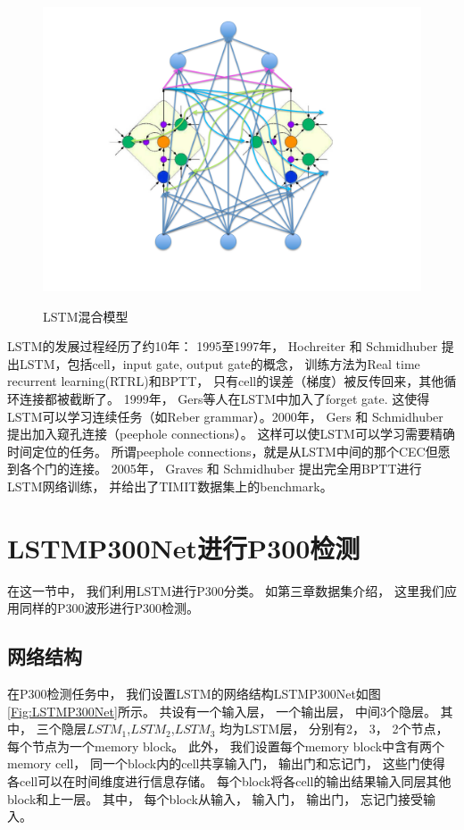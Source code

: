 \begin{figure}[htb]
  \centering
  \includegraphics[scale = 0.5]{Pictures/LSTM/lstm_mixture_model.pdf}\\
  \caption{LSTM混合模型}\label{Fig:lstm_mixture}
\end{figure}

LSTM的发展过程经历了约10年： 1995至1997年，  Hochreiter 和 Schmidhuber 提出LSTM，包括cell，input gate, output gate的概念， 训练方法为Real time recurrent learning(RTRL)和BPTT， 只有cell的误差（梯度）被反传回来，其他循环连接都被截断了。 1999年，  Gers等人在LSTM中加入了forget gate. 这使得LSTM可以学习连续任务（如Reber grammar）。2000年， Gers 和 Schmidhuber 提出加入窥孔连接（peephole connections）。 这样可以使LSTM可以学习需要精确时间定位的任务。 所谓peephole connections，就是从LSTM中间的那个CEC但愿到各个门的连接。 2005年， Graves 和 Schmidhuber 提出完全用BPTT进行LSTM网络训练， 并给出了TIMIT数据集上的benchmark。





\section{LSTMP300Net进行P300检测}

在这一节中， 我们利用LSTM进行P300分类。 如第三章数据集介绍， 这里我们应用同样的P300波形进行P300检测。 

\subsection{网络结构}
在P300检测任务中， 我们设置LSTM的网络结构LSTMP300Net如图\ref{Fig:LSTMP300Net}所示。 共设有一个输入层， 一个输出层， 中间3个隐层。 其中， 三个隐层$LSTM_1$,$LSTM_2$,$LSTM_3$ 均为LSTM层， 分别有2， 3， 2个节点， 每个节点为一个memory block。 此外， 我们设置每个memory block中含有两个memory cell， 同一个block内的cell共享输入门， 输出门和忘记门， 这些门使得各cell可以在时间维度进行信息存储。 每个block将各cell的输出结果输入同层其他block和上一层。 其中， 每个block从输入， 输入门， 输出门， 忘记门接受输入。 


